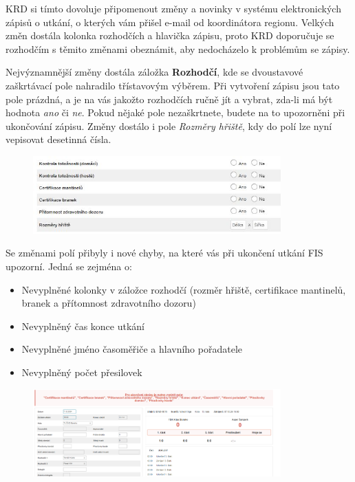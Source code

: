 \documentclass{newsletter}
\begin{document}
\clearpage
{}
KRD si tímto dovoluje připomenout změny a novinky v systému elektronických zápisů o utkání, o kterých vám přišel e-mail od koordinátora regionu. Velkých změn dostála kolonka rozhodčích a hlavička zápisu, proto KRD doporučuje se rozhodčím s těmito změnami obeznámit, aby nedocházelo k problémům se zápisy.

Nejvýznamnější změny dostála záložka \textbf{Rozhodčí}, kde se dvoustavové zaškrtávací pole nahradilo třístavovým výběrem. Při vytvoření zápisu jsou tato pole prázdná, a je na vás jakožto rozhodčích ručně jít a vybrat, zda-li má být hodnota \textit{ano} či \textit{ne}. Pokud nějaké pole nezaškrtnete, budete na to upozorněni při ukončování zápisu. Změny dostálo i pole \textit{Rozměry hřiště}, kdy do polí lze nyní vepisovat desetinná čísla.

\begin{figure}[h]
	\centering
	\includegraphics[width=0.85\textwidth, keepaspectratio]{nevyplneny_rozhodci}
\end{figure}

Se změnami polí přibyly i nové chyby, na které vás při ukončení utkání FIS upozorní. Jedná se zejména o:
\begin{itemize}
	\item Nevyplněné kolonky v záložce rozhodčí (rozměr hřiště, certifikace mantinelů, branek a přítomnost zdravotního dozoru)
	\item Nevyplněný čas konce utkání
	\item Nevyplněné jméno časoměřiče a hlavního pořadatele
	\item Nevyplněný počet přesilovek
\end{itemize}

\begin{figure}[h]
	\centering
	\includegraphics[width=0.85\textwidth, keepaspectratio]{nove_kontroly}
\end{figure}
\end{document}
